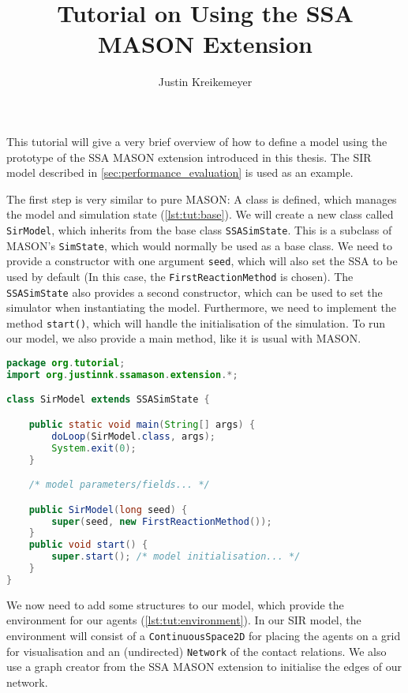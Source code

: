 \documentclass[a4paper, 12pt, bibliography=numbered]{article}
\title{Tutorial on Using the SSA MASON Extension}
\author{Justin Kreikemeyer}
\begin{document}
\maketitle

This tutorial will give a very brief overview of how to define a model using the prototype of the SSA MASON extension introduced in this thesis. The SIR model described in \autoref{sec:performance_evaluation} is used as an example.

The first step is very similar to pure MASON: A class is defined, which manages the model and simulation state (\autoref{lst:tut:base}). We will create a new class called \texttt{SirModel}, which inherits from the base class \texttt{SSASimState}. This is a subclass of MASON's \texttt{SimState}, which would normally be used as a base class. We need to provide a constructor with one argument \texttt{seed}, which will also set the SSA to be used by default (In this case, the \texttt{FirstReactionMethod} is chosen). The \texttt{SSASimState} also provides a second constructor, which can be used to set the simulator when instantiating the model. Furthermore, we need to implement the method \texttt{start()}, which will handle the initialisation of the simulation. To run our model, we also provide a main method, like it is usual with MASON.

\begin{lstlisting}[label=lst:tut:base,caption={The basis of our SIR model.},language=Java]
package org.tutorial;
import org.justinnk.ssamason.extension.*;

class SirModel extends SSASimState {

    public static void main(String[] args) {
        doLoop(SirModel.class, args);
        System.exit(0);
    }

    /* model parameters/fields... */

    public SirModel(long seed) {
        super(seed, new FirstReactionMethod());
    }
    public void start() {
        super.start(); /* model initialisation... */
    }
}
\end{lstlisting}

We now need to add some structures to our model, which provide the environment for our agents (\autoref{lst:tut:environment}). In our SIR model, the environment will consist of a \texttt{ContinuousSpace2D} for placing the agents on a grid for visualisation and an (undirected) \texttt{Network} of the contact relations. We also use a graph creator from the SSA MASON extension to initialise the edges of our network.
\end{document}
